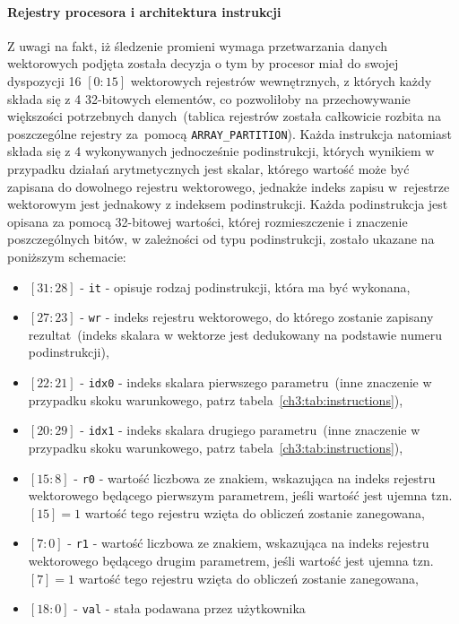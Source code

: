 \paragraph{Rejestry procesora i architektura instrukcji}
Z uwagi na fakt, iż śledzenie promieni wymaga przetwarzania danych wektorowych podjęta została decyzja o tym by procesor miał do swojej dyspozycji 16 $[0:15]$ wektorowych rejestrów wewnętrznych, z których każdy składa się z 4 32-bitowych elementów, co pozwoliłoby na przechowywanie większości potrzebnych danych~(tablica rejestrów została całkowicie rozbita na poszczególne rejestry za~pomocą \texttt{ARRAY\_PARTITION}). Każda instrukcja natomiast składa się z 4 wykonywanych jednocześnie podinstrukcji, których wynikiem w przypadku działań arytmetycznych jest skalar, którego wartość może być zapisana  do dowolnego rejestru wektorowego, jednakże indeks zapisu w~rejestrze wektorowym jest jednakowy z indeksem podinstrukcji. Każda podinstrukcja jest opisana za pomocą 32-bitowej wartości, której rozmieszczenie i znaczenie poszczególnych bitów, w zależności od typu podinstrukcji, zostało ukazane na poniższym schemacie:
\begin{itemize}
\item[] $[31:28]$ - \texttt{it} - opisuje rodzaj podinstrukcji, która ma być wykonana,
\item[] $[27:23]$ - \texttt{wr} - indeks rejestru wektorowego, do którego zostanie zapisany rezultat~(indeks skalara w wektorze jest dedukowany na podstawie numeru podinstrukcji),
\item[] $[22:21]$ - \texttt{idx0} - indeks skalara pierwszego parametru~(inne znaczenie w przypadku skoku warunkowego, patrz tabela~\ref{ch3:tab:instructions}),
\item[] $[20:29]$ - \texttt{idx1} - indeks skalara drugiego parametru~(inne znaczenie w przypadku skoku warunkowego, patrz tabela~\ref{ch3:tab:instructions}),
\item[] $[15:8]$ - \texttt{r0} - wartość liczbowa ze znakiem, wskazująca na indeks rejestru wektorowego będącego pierwszym parametrem, jeśli wartość jest ujemna tzn.~$[15]=1$ wartość tego rejestru wzięta do obliczeń zostanie zanegowana,
\item[] $[7:0]$ - \texttt{r1} - wartość liczbowa ze znakiem, wskazująca na indeks rejestru wektorowego będącego drugim parametrem, jeśli wartość jest ujemna tzn. $[7]=1$ wartość tego rejestru wzięta do obliczeń zostanie zanegowana,
\item[] $[18:0]$ - \texttt{val} - stała podawana przez użytkownika
\end{itemize}
